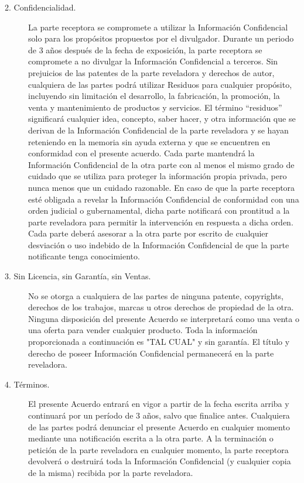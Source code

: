\documentclass[a4paper,twocolumn]{report}
\begin{document}
{\begin{description}
\item[2. Confidencialidad.] La parte receptora se compromete a utilizar la Información Confidencial solo para los propósitos propuestos por el divulgador. Durante un periodo de 3 años después de la fecha de exposición, la parte receptora se compromete a no divulgar la Información Confidencial a terceros. Sin prejuicios de las patentes de la parte reveladora y derechos de autor, cualquiera de las partes podrá utilizar Residuos para cualquier propósito, incluyendo sin limitación el desarrollo, la fabricación, la promoción, la venta y mantenimiento de productos y servicios. El término ``residuos'' significará cualquier idea, concepto, saber hacer, y otra información que se derivan de la Información Confidencial de la parte reveladora y se hayan reteniendo en la memoria sin ayuda externa y que se encuentren en conformidad con el presente acuerdo.
Cada parte mantendrá la Información Confidencial de la otra parte con al menos el mismo grado de cuidado que se utiliza para proteger la información propia privada, pero nunca menos que un cuidado razonable.
En caso de que la parte receptora esté obligada a revelar la Información Confidencial de conformidad con una orden judicial o gubernamental, dicha parte notificará con prontitud a la parte reveladora para permitir la intervención en respuesta a dicha orden. Cada parte deberá asesorar a la otra parte por escrito de cualquier desviación o uso indebido de la Información Confidencial de que la parte notificante tenga conocimiento.

\item[3. Sin Licencia, sin Garantía, sin Ventas.] No se otorga a cualquiera de las partes de ninguna patente, copyrights, derechos de los trabajos, marcas u otros derechos de propiedad de la otra. Ninguna disposición del presente Acuerdo se interpretará como una venta o una oferta para vender cualquier producto. Toda la información proporcionada a continuación es "TAL CUAL" y sin garantía. El título y derecho de poseer Información Confidencial permanecerá en la parte reveladora.

\item[4. Términos.] El presente Acuerdo entrará en vigor a partir de la fecha escrita arriba y continuará por un período de 3 años, salvo que finalice antes. Cualquiera de las partes podrá denunciar el presente Acuerdo en cualquier momento mediante una notificación escrita a la otra parte. A la terminación o petición de la parte reveladora en cualquier momento, la parte receptora devolverá o destruirá toda la Información Confidencial (y cualquier copia de la misma) recibida por la parte reveladora.


\end{description}}
\end{document}
